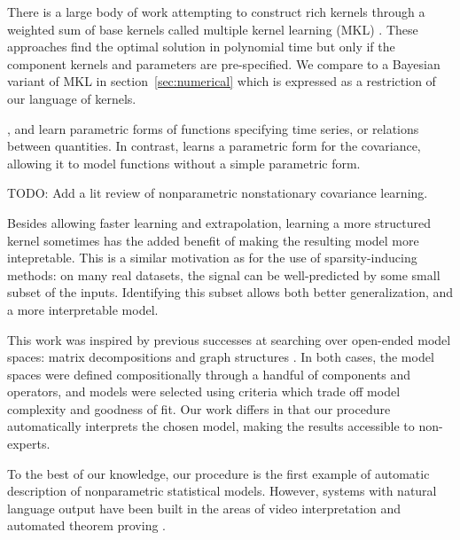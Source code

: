 There is a large body of work attempting to construct rich kernels through a weighted sum of base kernels called multiple kernel learning (MKL) \citep[e.g.][]{bach2004multiple}.
These approaches find the optimal solution in polynomial time but only if the component kernels and parameters are pre-specified.
We compare to a Bayesian variant of MKL in section~\ref{sec:numerical} which is expressed as a restriction of our language of kernels.

\cite{todorovski1997declarative}, \cite{washio1999discovering} and \cite{schmidt2009distilling} learn parametric forms of functions specifying time series, or relations between quantities.
In contrast, \procedurename{} learns a parametric form for the covariance, allowing it to model functions without a simple parametric form.




TODO: Add a lit review of nonparametric nonstationary covariance learning.

Besides allowing faster learning and extrapolation, learning a more structured kernel sometimes has the added benefit of making the resulting model more intepretable.
This is a similar motivation as for the use of sparsity-inducing methods: on many real datasets, the signal can be well-predicted by some small subset of the inputs.
Identifying this subset allows both better generalization, and a more interpretable model.



This work was inspired by previous successes at searching over open-ended model spaces: matrix decompositions \citep{grosse2012exploiting} and graph structures \citep{kemp2008discovery}.
In both cases, the model spaces were defined compositionally through a handful of components and operators, and models were selected using criteria which trade off model complexity and goodness of fit.
Our work differs in that our procedure automatically interprets the chosen model, making the results accessible to non-experts.

To the best of our knowledge, our procedure is the first example of automatic description of nonparametric statistical models.
However, systems with natural language output have been built in the areas of video interpretation \citep{barbu2012video} and automated theorem proving \citep{GanesalingamG13}.



